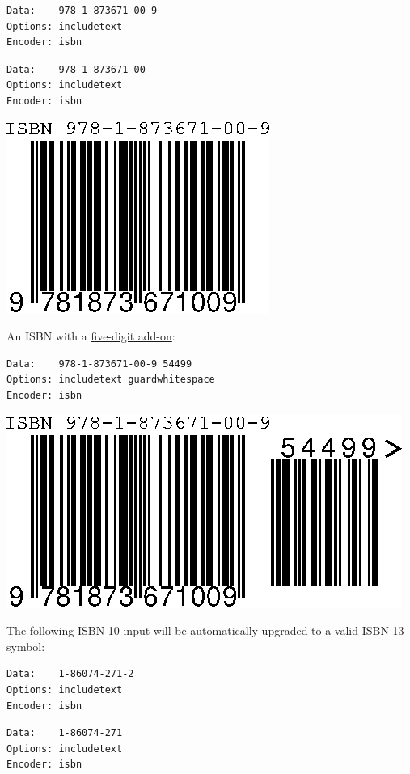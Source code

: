 \begin{verbatim}
Data:    978-1-873671-00-9
Options: includetext
Encoder: isbn
\end{verbatim}

\begin{verbatim}
Data:    978-1-873671-00
Options: includetext
Encoder: isbn
\end{verbatim}

\includegraphics{images/isbn-1.eps}

An ISBN with a \protect\hyperlink{ean-5}{five-digit add-on}:

\begin{verbatim}
Data:    978-1-873671-00-9 54499
Options: includetext guardwhitespace
Encoder: isbn
\end{verbatim}

\includegraphics{images/isbn-2.eps}

The following ISBN-10 input will be automatically upgraded to a valid
ISBN-13 symbol:

\begin{verbatim}
Data:    1-86074-271-2
Options: includetext
Encoder: isbn
\end{verbatim}

\begin{verbatim}
Data:    1-86074-271
Options: includetext
Encoder: isbn
\end{verbatim}

